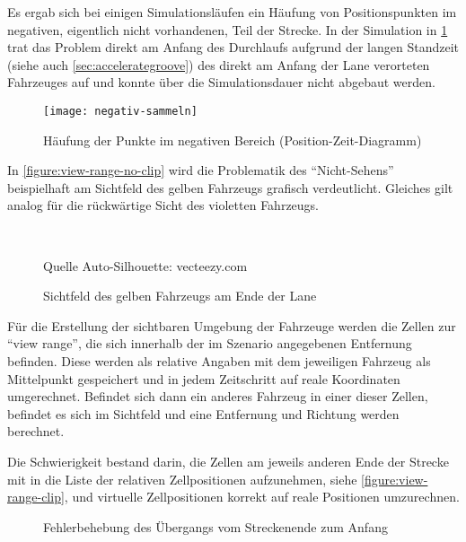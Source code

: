 Es ergab sich bei einigen Simulationsläufen ein Häufung von Positionspunkten im negativen, eigentlich nicht vorhandenen, Teil der Strecke.
In der Simulation in \cref{figure:negativ-sammeln} trat das Problem direkt am Anfang des Durchlaufs aufgrund der langen Standzeit (siehe auch \cref{sec:accelerategroove}) des direkt am Anfang der Lane verorteten Fahrzeuges auf und konnte über die Simulationsdauer nicht abgebaut werden.
\begin{figure}[hptb]
 \centering
 \texttt{[image: negativ-sammeln]}
 \caption[Punktehäufung im negativen Bereich]
 		 {Häufung der Punkte im negativen Bereich (Position-Zeit-Diagramm)}
 \label{figure:negativ-sammeln}
\end{figure} 

In \cref{figure:view-range-no-clip} wird die Problematik des \enquote{Nicht-Sehens} beispielhaft am Sichtfeld des gelben Fahrzeugs grafisch verdeutlicht. 
Gleiches gilt analog für die rückwärtige Sicht des violetten Fahrzeugs.

\begin{figure}[hptb]
  \centering
     \\
  \caption[Umbrechen des Sichtfelds eines Fahrzeugs am Ende der Lane]
          {Sichtfeld des gelben Fahrzeugs am Ende der Lane}
          {\footnotesize Quelle Auto-Silhouette: vecteezy.com}
  \label{figure:view-range-no-clip-clip}
\end{figure}

Für die Erstellung der sichtbaren Umgebung der Fahrzeuge werden die Zellen zur \enquote{view range}, die sich innerhalb der im Szenario angegebenen Entfernung befinden.
Diese werden als relative Angaben mit dem jeweiligen Fahrzeug als Mittelpunkt gespeichert und in jedem Zeitschritt auf reale Koordinaten umgerechnet.
Befindet sich dann ein anderes Fahrzeug in einer dieser Zellen, befindet es sich im Sichtfeld und eine Entfernung und Richtung werden berechnet.

Die Schwierigkeit bestand darin, die Zellen am jeweils anderen Ende der Strecke mit in die Liste der relativen Zellpositionen aufzunehmen, siehe \cref{figure:view-range-clip}, und virtuelle Zellpositionen korrekt auf reale Positionen umzurechnen.

\begin{figure}[hptb]
  \centering
     \qquad 
  \caption[Fehlerbehebung: Übergang vom Streckenende zum Anfang]
          {Fehlerbehebung des Übergangs vom Streckenende zum Anfang}
  \label{figure:go-negative}
\end{figure}

